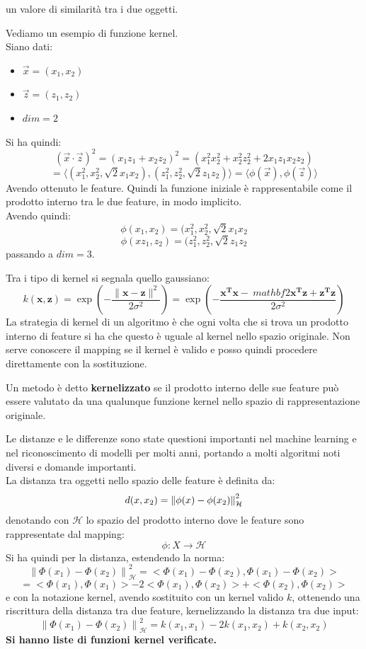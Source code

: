 un valore di similarità tra i due oggetti. 
\begin{esempio}
  Vediamo un esempio di funzione kernel. \\
  Siano dati:
  \begin{itemize}
    \item $\vec{x}=(x_1, x_2)$
    \item $\vec{z}=(z_1, z_2)$
    \item $dim=2$
  \end{itemize}
  Si ha quindi:
  \[(\vec{x}\cdot\vec{z})^2=(x_1z_1+x_2z_2)^2
    =(x_1^2x_2^2+x_2^2z_2^2+2x_1z_1x_2z_2)\]
  \[=\langle\left(x_{1}^{2}, x_{2}^{2}, \sqrt{2} x_{1}
      x_{2}\right),\left(z_{1}^{2}, z_{2}^{2}, \sqrt{2} z_{1}
      z_{2}\right)\rangle=\langle\phi(\vec{x}),\phi(\vec{z})\rangle\]
  Avendo ottenuto le feature. Quindi la funzione iniziale è rappresentabile come
  il prodotto interno tra le due feature, in modo implicito.\\
  Avendo quindi:
  \[\phi(x_1, x_2)=(x_1^2, x_2^2,\sqrt{2}x_1x_2\]
  \[\phi(xz_1, z_2)=(z_1^2, z_2^2,\sqrt{2}z_1z_2\]
  passando a $dim=3$.
\end{esempio}
Tra i tipo di kernel si segnala quello gaussiano:
\[ k(\mathbf{x}, \mathbf{z}) =\exp \left(-\frac{\|\mathbf{x}-
      \mathbf{z}\|^{2}}{2 \sigma^{2}}\right) 
  =\exp \left(-\frac{\mathbf{x}^{\mathbf{T}} \mathbf{x}-\
      mathbf{2} \mathbf{x}^{\mathbf{T}} \mathbf{z}+
      \mathbf{z}^{\mathbf{T}} \mathbf{z}}{2 \sigma^{2}}\right)\]
La strategia di kernel di un algoritmo è che ogni volta che si trova un prodotto
interno di feature si ha che questo è uguale al kernel nello spazio
originale. Non serve conoscere il mapping se il kernel è valido e posso quindi
procedere direttamente con la sostituzione.
\begin{definizione}
  Un metodo è detto \textbf{kernelizzato} se il prodotto interno delle sue
  feature può essere valutato da una qualunque funzione kernel nello spazio di
  rappresentazione originale.
\end{definizione}
Le distanze e le differenze sono state questioni importanti nel machine
learning e nel riconoscimento di modelli per molti anni, portando a molti
algoritmi noti diversi e domande importanti.\\
La distanza tra oggetti nello spazio delle feature è definita da:
\[d(x, x_2)=\norm{\phi(x)-\phi(x_2)}^2_{\mathcal{H}}\]
denotando con $\mathcal{H}$ lo spazio del prodotto interno dove le feature sono
rappresentate dal mapping:
\[\phi:X\to \mathcal{H}\]
Si ha quindi per la distanza, estendendo la norma:
\[
  \left\|\Phi\left(x_{1}\right)-\Phi\left(x_{2}\right)\right\|_{\mathcal{H}}^{2}
  =<\Phi\left(x_{1}\right)-\Phi\left(x_{2}\right),
    \Phi\left(x_{1}\right)-\Phi\left(x_{2}\right)>\]
    \[
  =<\Phi\left(x_{1}\right), \Phi\left(x_{1}\right)>-2<\Phi
  \left(x_{1}\right), \Phi\left(x_{2}\right)>+<\Phi\left(x_{2}\right),
  \Phi\left(x_{2}\right)>
\]
e con la notazione kernel, avendo sostituito con un kernel valido $k$, ottenendo
una riscrittura della distanza tra due feature, kernelizzando la distanza tra
due input:
\[\left\|\Phi\left(x_{1}\right)-\Phi\left(x_{2}\right)\right\|_{\mathcal{H}}^{2}
  =k(x_1, x_1)-2k(x_1, x_2)+k(x_2, x_2)\]
\textbf{Si hanno liste di funzioni kernel verificate.}